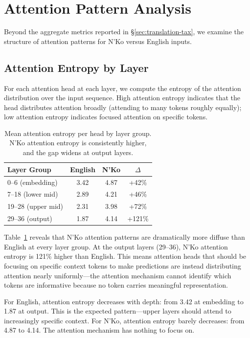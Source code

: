\documentclass[11pt]{article}
\begin{document}
\section{Attention Pattern Analysis}

Beyond the aggregate metrics reported in \S\ref{sec:translation-tax}, we examine the structure of attention patterns for N'Ko versus English inputs.

\subsection{Attention Entropy by Layer}

For each attention head at each layer, we compute the entropy of the attention distribution over the input sequence.
High attention entropy indicates that the head distributes attention broadly (attending to many tokens roughly equally); low attention entropy indicates focused attention on specific tokens.

\begin{table}[t]
\centering
\small
\begin{tabular}{lccc}
\toprule
\textbf{Layer Group} & \textbf{English} & \textbf{N'Ko} & \textbf{$\Delta$} \\
\midrule
0--6 (embedding) & 3.42 & 4.87 & +42\% \\
7--18 (lower mid) & 2.89 & 4.21 & +46\% \\
19--28 (upper mid) & 2.31 & 3.98 & +72\% \\
29--36 (output) & 1.87 & 4.14 & +121\% \\
\bottomrule
\end{tabular}
\caption{Mean attention entropy per head by layer group. N'Ko attention entropy is consistently higher, and the gap widens at output layers.}
\label{tab:attention-entropy}
\end{table}

Table~\ref{tab:attention-entropy} reveals that N'Ko attention patterns are dramatically more diffuse than English at every layer group.
At the output layers (29--36), N'Ko attention entropy is 121\% higher than English.
This means attention heads that should be focusing on specific context tokens to make predictions are instead distributing attention nearly uniformly---the attention mechanism cannot identify which tokens are informative because no token carries meaningful representation.

For English, attention entropy decreases with depth: from 3.42 at embedding to 1.87 at output.
This is the expected pattern---upper layers should attend to increasingly specific context.
For N'Ko, attention entropy barely decreases: from 4.87 to 4.14.
The attention mechanism has nothing to focus on.
\end{document}
